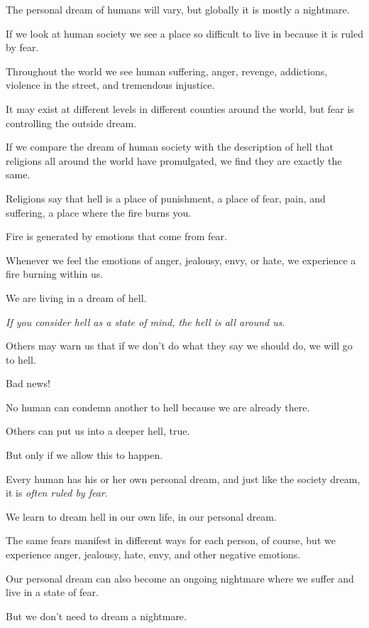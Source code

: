 \documentclass{article}
\numberwithin{equation}{section}
\begin{document}
The personal dream of humans will vary, but globally it is mostly a nightmare.

If we look at human society we see a place so difficult to live in because it is ruled by fear.

Throughout the world we see human suffering, anger, revenge, addictions, violence in the street, and tremendous injustice.

It may exist at different levels in different counties around the world, but fear is controlling the outside dream.

%
If we compare the dream of human society with the description of hell that religions all around the world have promulgated, we find they are exactly the same.

Religions say that hell is a place of punishment, a place of fear, pain, and suffering, a place where the fire burns you.

Fire is generated by emotions that come from fear.

Whenever we feel the emotions of anger, jealousy, envy, or hate, we experience a fire burning within us.

We are living in a dream of hell.

%
\textit{If you consider hell as a state of mind, the hell is all around us}.

Others may warn us that if we don't do what they say we should do, we will go to hell.

Bad news!


No human can condemn another to hell because we are already there.

Others can put us into a deeper hell, true.

But only if we allow this to happen.

%
Every human has his or her own personal dream, and just like the society dream, it is \textit{often ruled by fear}.

We learn to dream hell in our own life, in our personal dream.

The same fears manifest in different ways for each person, of course, but we experience anger, jealousy, hate, envy, and other negative emotions.

Our personal dream can also become an ongoing nightmare where we suffer and live in a state of fear.

But we don't need to dream a nightmare.
\end{document}
